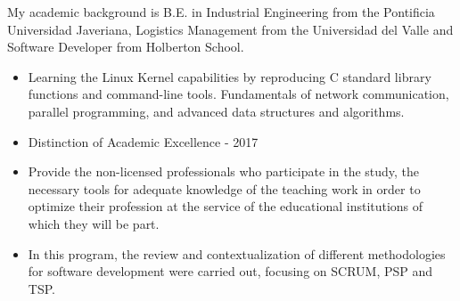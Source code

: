 \documentclass[paper=a4,fontsize=10pt,ragged2e,withhyper]{altacv}%
\begin{document}
\begin{paracol}{2}
My academic background is B.E. in Industrial Engineering from the Pontificia Universidad Javeriana, Logistics Management from the Universidad del Valle and Software Developer from Holberton School. %

%

\divider
{}
\begin{itemize}
 \item Learning the Linux Kernel capabilities by reproducing C standard library functions and command{-}line tools. Fundamentals of network communication, parallel programming, and advanced data structures and algorithms. 
\end{itemize}
\divider
{}
\begin{itemize}
 \item Distinction of Academic Excellence {-} 2017 
\end{itemize}
\divider
{}
\begin{itemize}
 \item Provide the non{-}licensed professionals who participate in the study, the necessary tools for adequate knowledge of the teaching work in order to optimize their profession at the service of the educational institutions of which they will be part. 
\end{itemize}
\divider
{}
\begin{itemize}
 \item In this program, the review and contextualization of different methodologies for software development were carried out, focusing on SCRUM, PSP and TSP. 
\end{itemize}
\divider
{}

\end{paracol}
\end{document}
